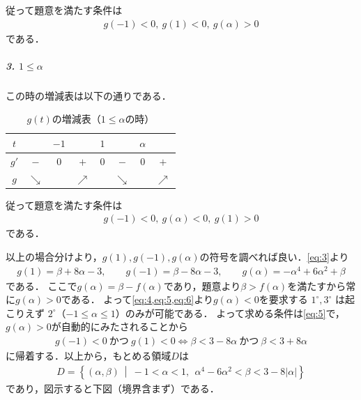 \documentclass[../../main.tex]{subfiles}
\begin{document}
従って題意を満たす条件は
\begin{align}
  g(-1)<0,\ g(1)<0,\ g(\alpha)>0 \label{eq:5}
\end{align}
である．

\subparagraph{3. $1\le\alpha$}

この時の増減表は以下の通りである．

\begin{table}[htb]
  \begin{center}
    \caption{$g(t)$の増減表（$1\le\alpha$の時）}
    \begin{tabular}{c|ccccccc}
      $t$ & & $-1$ & & $1$ & & $\alpha$ & \\
      \hline
      $g'$ & $-$ & $0$ & $+$ & $0$ & $-$ & $0$ & $+$ \\
      \hline
      $g$ & $\searrow$ & & $\nearrow$ & & $\searrow$ & & $\nearrow$
    \end{tabular}
  \end{center}
\end{table}

従って題意を満たす条件は
\begin{align}
  g(-1)<0,\ g(\alpha)<0,\ g(1)>0 \label{eq:6}
\end{align}
である．
\casesend

以上の場合分けより，$g(1), g(-1), g(\alpha)$の符号を調べれば良い．\cref{eq:3}より
\begin{align}
  g(1)=\beta+8\alpha-3,\qquad g(-1)=\beta-8\alpha-3,\qquad g(\alpha)=-\alpha^4+6\alpha^2+\beta
\end{align}
である．
ここで$g(\alpha)=\beta-f(\alpha)$であり，題意より$\beta>f(\alpha)$を満たすから常に$g(\alpha)>0$である．
よって\cref{eq:4,eq:5,eq:6}より$g(\alpha)<0$を要求する $1^\circ,3^\circ$ は起こりえず $2^\circ$（$-1\le\alpha\le1$）のみが可能である．
よって求める条件は\cref{eq:5}で，$g(\alpha)>0$が自動的にみたされることから
\begin{align}
  g(-1)<0\ \text{かつ}\ g(1)<0 \iff \beta<3-8\alpha\ \text{かつ}\ \beta<3+8\alpha
\end{align}
に帰着する．以上から，もとめる領域$D$は
\begin{align}
  D=\left\{(\alpha,\beta)\ \middle|\ -1<\alpha<1,\ \ \alpha^4-6\alpha^2<\beta<3-8|\alpha|\right\}
\end{align}
であり，図示すると下図（境界含まず）である．
\end{document}
